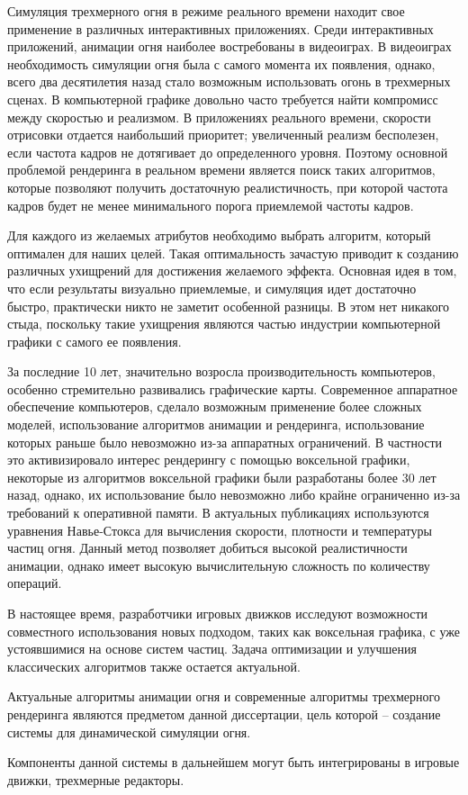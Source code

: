 Симуляция трехмерного огня в режиме реального времени находит свое применение в
различных интерактивных приложениях.  Среди интерактивных приложений, анимации
огня наиболее востребованы в видеоиграх. В видеоиграх необходимость симуляции
огня была с самого момента их появления, однако, всего два десятилетия назад
стало возможным использовать огонь в трехмерных сценах.  В компьютерной графике
довольно часто требуется найти компромисс между скоростью и реализмом. В
приложениях реального времени, скорости отрисовки отдается наибольший приоритет;
увеличенный реализм бесполезен, если частота кадров не дотягивает до
определенного уровня. Поэтому основной проблемой рендеринга в реальном времени
является поиск таких алгоритмов, которые позволяют получить достаточную
реалистичность, при которой частота кадров будет не менее минимального порога
приемлемой частоты кадров.

Для каждого из желаемых атрибутов необходимо выбрать алгоритм, который оптимален
для наших целей. Такая оптимальность зачастую приводит к созданию различных
ухищрений для достижения желаемого эффекта. Основная идея в том, что если
результаты визуально приемлемые, и симуляция идет достаточно быстро, практически
никто не заметит особенной разницы. В этом нет никакого стыда, поскольку такие
ухищрения являются частью индустрии компьютерной графики с самого ее появления.

За последние 10 лет, значительно возросла производительность компьютеров,
особенно стремительно развивались графические карты. Современное аппаратное
обеспечение компьютеров, сделало возможным применение более сложных моделей,
использование алгоритмов анимации и рендеринга, использование которых раньше
было невозможно из-за аппаратных ограничений. В частности это активизировало
интерес рендерингу с помощью воксельной графики, некоторые из алгоритмов
воксельной графики были разработаны более 30 лет назад, однако, их использование
было невозможно либо крайне ограниченно из-за требований к оперативной памяти. В
актуальных публикациях используются уравнения Навье-Стокса для вычисления
скорости, плотности и температуры частиц огня.  Данный метод позволяет добиться
высокой реалистичности анимации, однако имеет высокую вычислительную сложность
по количеству операций.

В настоящее время, разработчики игровых движков исследуют возможности
совместного использования новых подходом, таких как воксельная графика, с уже
устоявшимися на основе систем частиц. Задача оптимизации и улучшения
классических алгоритмов также остается актуальной.

Актуальные алгоритмы анимации огня и современные алгоритмы трехмерного
рендеринга являются предметом данной диссертации, цель которой -- создание
системы для динамической симуляции огня.

Компоненты данной системы в дальнейшем могут быть интегрированы в игровые
движки, трехмерные редакторы.
